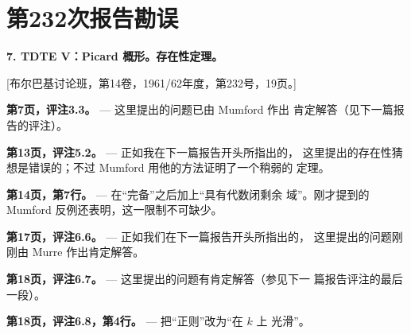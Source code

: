 \clearpage
\chapter*{第232次报告勘误}

\noindent\textbf{7. TDTE V：Picard 概形。存在性定理。}

\begin{center}
[布尔巴基讨论班，第14卷，1961/62年度，第232号，19页。]
\end{center}

\noindent\textbf{第7页，评注3.3。} --- 这里提出的问题已由 Mumford 作出
肯定解答（见下一篇报告的评注）。

\noindent\textbf{第13页，评注5.2。} --- 正如我在下一篇报告开头所指出的，
这里提出的存在性猜想是错误的；不过 Mumford 用他的方法证明了一个稍弱的
定理。

\noindent\textbf{第14页，第7行。} --- 在“完备”之后加上“具有代数闭剩余
域”。刚才提到的 Mumford 反例还表明，这一限制不可缺少。

\noindent\textbf{第17页，评注6.6。} --- 正如我们在下一篇报告开头所指出的，
这里提出的问题刚刚由 Murre 作出肯定解答。

\noindent\textbf{第18页，评注6.7。} --- 这里提出的问题有肯定解答（参见下一
篇报告评注的最后一段）。

\noindent\textbf{第18页，评注6.8，第4行。} --- 把“正则”改为“在 $k$ 上
光滑”。

\par
